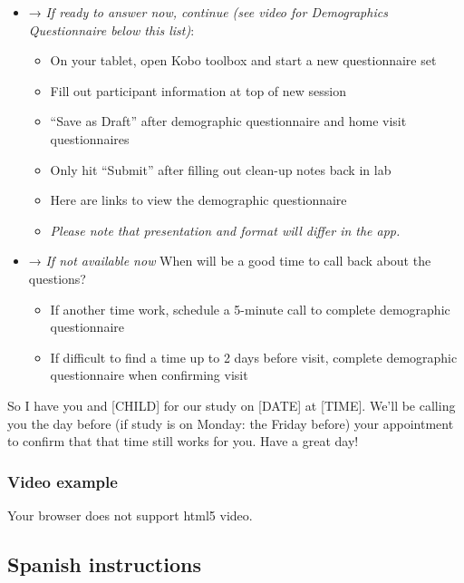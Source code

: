 \documentclass[
  12pt,
]{book}
\providecommand{\tightlist}{%
  \setlength{\itemsep}{0pt}\setlength{\parskip}{0pt}}
\begin{document}
\begin{itemize}
\tightlist
\item
  → \emph{If ready to answer now, continue (see video for Demographics Questionnaire below this list)}:

  \begin{itemize}
  \tightlist
  \item
    On your tablet, open Kobo toolbox and start a new questionnaire set
  \item
    Fill out participant information at top of new session
  \item
    ``Save as Draft'' after demographic questionnaire and home visit questionnaires
  \item
    Only hit ``Submit'' after filling out clean-up notes back in lab
  \item
    Here are links to view the demographic questionnaire  
  \item
    \emph{Please note that presentation and format will differ in the app.}
  \end{itemize}
\item
  → \emph{If not available now} When will be a good time to call back about the questions?

  \begin{itemize}
  \tightlist
  \item
    If another time work, schedule a 5-minute call to complete demographic questionnaire
  \item
    If difficult to find a time up to 2 days before visit, complete demographic questionnaire when confirming visit
  \end{itemize}
\end{itemize}

So I have you and {[}CHILD{]} for our study on {[}DATE{]} at {[}TIME{]}. We'll be calling you the day before (if study is on Monday: the Friday before) your appointment to confirm that that time still works for you. Have a great day!

\hypertarget{recruiting_call_video}{%
\subsubsection*{Video example}\label{recruiting_call_video}}

Your browser does not support html5 video.

\hypertarget{spanish_instructions}{%
\subsection*{Spanish instructions}\label{spanish_instructions}}
\end{document}
